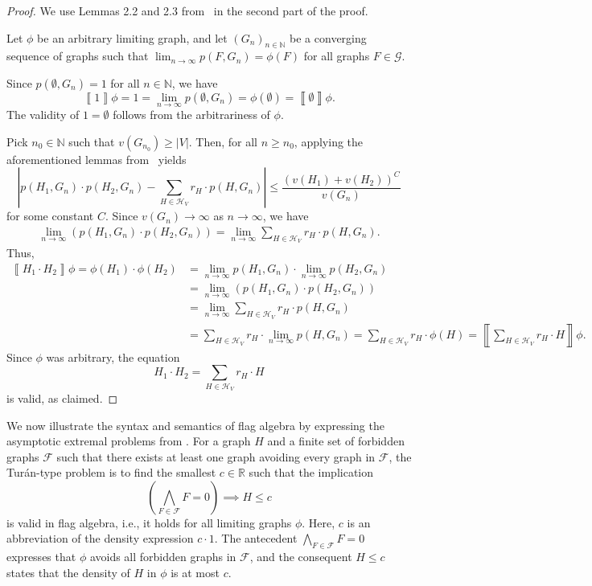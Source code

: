 \documentclass{article}
\newcommand*{\emptygraph}{\emptyset}
\newcommand*{\db}[1]{\left\llbracket #1 \right\rrbracket}
\begin{document}
\begin{proof}
  We use Lemmas 2.2 and 2.3 from~\cite{Razborov2007} in the second part of the proof.

  Let $\phi$ be an arbitrary limiting graph, and let $(G_n)_{n \in \mathbb{N}}$ be a converging sequence of graphs such that 
  $\lim_{n \to \infty} p(F,G_n) = \phi(F)$ for all graphs $F \in \mathcal{G}$. 
  
  Since $p(\emptyset,G_n) = 1$ for all $n \in \mathbb{N}$, we have
  \[
  \db{1}\phi = 1 = \lim_{n \to \infty} p(\emptyset,G_n) = \phi(\emptyset) = \db{\emptygraph}\phi.
  \]
  The validity of $1 = \emptygraph$ follows from the arbitrariness of $\phi$.

  Pick $n_0 \in \mathbb{N}$ such that $v(G_{n_0}) \geq |V|$. Then, for all $n \geq n_0$, applying the aforementioned lemmas from~\cite{Razborov2007} yields
  \[
  \left|
  p(H_1,G_n) \cdot p(H_2,G_n) - 
  \sum_{H \in \mathcal{H}_V} r_H \cdot p(H,G_n)
  \right| 
  \leq
  \frac{(v(H_1) + v(H_2))^C}{v(G_n)}
  \]
  for some constant $C$. Since $v(G_n) \to \infty$ as $n \to \infty$, we have
  \begin{align*}
  \lim_{n \to \infty} (p(H_1,G_n) \cdot p(H_2,G_n)) 
  = 
  \lim_{n \to \infty} \sum_{H \in \mathcal{H}_V} r_H \cdot p(H,G_n).
  \end{align*} 
  Thus,
  \begin{align*}
  \db{H_1 \cdot H_2}\phi 
  = \phi(H_1) \cdot \phi(H_2)
  & {} =
  \lim_{n \to \infty} p(H_1,G_n) \cdot \lim_{n \to \infty} p(H_2,G_n)
  \\
  & {} =
  \lim_{n \to \infty} (p(H_1,G_n) \cdot p(H_2,G_n)) 
  \\
  & {} =
  \lim_{n \to \infty} \sum_{H \in \mathcal{H}_V} r_H \cdot p(H,G_n)
  \\
  & {} =
  \sum_{H \in \mathcal{H}_V} r_H \cdot \lim_{n \to \infty} p(H,G_n)
  = 
  \sum_{H \in \mathcal{H}_V} r_H \cdot \phi(H)
  = \db{\sum_{H \in \mathcal{H}_V} r_H \cdot H}\phi.
  \end{align*}
  Since $\phi$ was arbitrary, the equation
  \[
  H_1 \cdot H_2 = \sum_{H \in \mathcal{H}_V} r_H \cdot H
  \]
  is valid, as claimed.
\end{proof}

We now illustrate the syntax and semantics of flag algebra by expressing the asymptotic extremal problems from .
For a graph $H$ and a finite set of forbidden graphs $\mathcal{F}$ such that there exists at least one graph avoiding every graph in $\mathcal{F}$, the Tur\'an-type problem is to find the smallest $c \in \mathbb{R}$ such that the implication
\begin{equation}
  \label{eqn:turan-assertion}
\left(\bigwedge_{F \in \mathcal{F}} F = 0 \right) \implies H \leq c
\end{equation}
is valid in flag algebra, i.e., it holds for all limiting graphs $\phi$.
Here, $c$ is an abbreviation of the density expression $c \cdot 1$.
The antecedent $\bigwedge_{F \in \mathcal{F}} F = 0$ expresses that $\phi$ avoids all forbidden graphs in $\mathcal{F}$, and the consequent $H \leq c$ states that the density of $H$ in $\phi$ is at most $c$.
\end{document}
